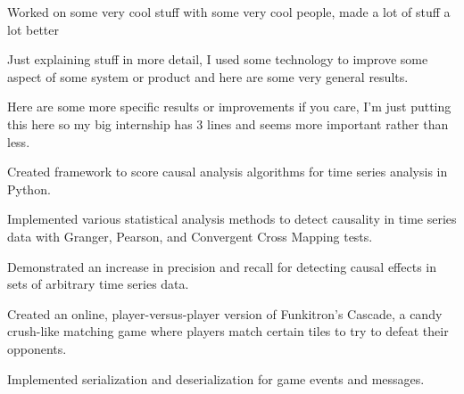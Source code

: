 
\begin{tightemize}
\item Worked on some very cool stuff with some very cool people, made a lot of stuff a lot better
\item Just explaining stuff in more detail, I used some technology to improve some aspect of some system or product and here are some very general results.
\item Here are some more specific results or improvements if you care, I'm just putting this here so my big internship has 3 lines and seems more important rather than less.
\end{tightemize}
\subsectionsep

\begin{tightemize}
\item Created framework to score causal analysis algorithms for time series
  analysis in Python.
\item Implemented various statistical analysis methods to detect causality in
  time series data with Granger, Pearson, and Convergent Cross Mapping tests.
\item Demonstrated an increase in precision and recall for detecting causal effects in sets of
  arbitrary time series data.
\end{tightemize}
\subsectionsep

\begin{tightemize}
\item Created an online, player-versus-player version of Funkitron's Cascade,
  a candy crush-like matching game where players match certain tiles to try to
  defeat their opponents.
\item Implemented serialization and deserialization for game events and messages.
\end{tightemize}
\subsectionsep